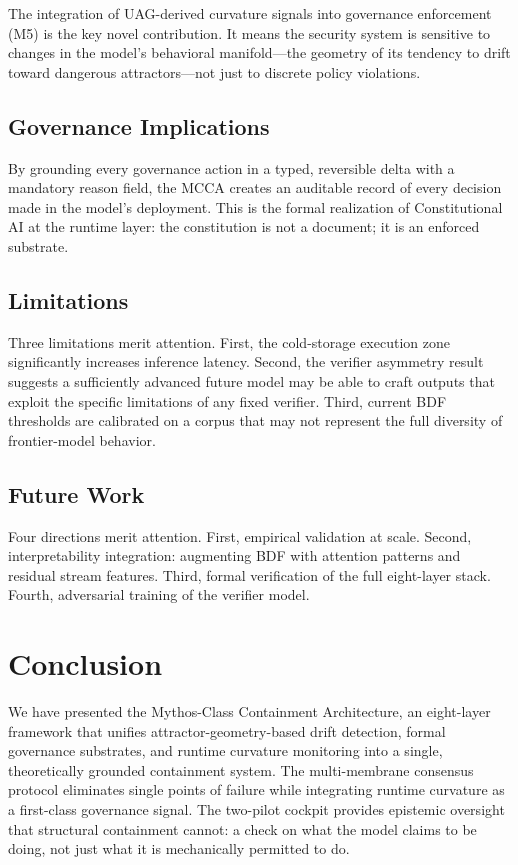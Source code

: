 \documentclass[11pt]{article}
\begin{document}
The integration of UAG-derived curvature signals into governance enforcement
(M5) is the key novel contribution.
It means the security system is sensitive to changes in the model's
behavioral manifold---the geometry of its tendency to drift toward dangerous
attractors---not just to discrete policy violations.

\subsection{Governance Implications}

By grounding every governance action in a typed, reversible delta with a
mandatory reason field, the MCCA creates an auditable record of every
decision made in the model's deployment.
This is the formal realization of Constitutional AI at the runtime layer:
the constitution is not a document; it is an enforced substrate.

\subsection{Limitations}

Three limitations merit attention.
First, the cold-storage execution zone significantly increases inference
latency.
Second, the verifier asymmetry result suggests a sufficiently advanced
future model may be able to craft outputs that exploit the specific
limitations of any fixed verifier.
Third, current BDF thresholds are calibrated on a corpus that may not
represent the full diversity of frontier-model behavior.

\subsection{Future Work}

Four directions merit attention.
First, empirical validation at scale.
Second, interpretability integration: augmenting BDF with attention patterns
and residual stream features.
Third, formal verification of the full eight-layer stack.
Fourth, adversarial training of the verifier model.

\section{Conclusion}

We have presented the Mythos-Class Containment Architecture, an eight-layer
framework that unifies attractor-geometry-based drift detection, formal
governance substrates, and runtime curvature monitoring into a single,
theoretically grounded containment system.
The multi-membrane consensus protocol eliminates single points of failure
while integrating runtime curvature as a first-class governance signal.
The two-pilot cockpit provides epistemic oversight that structural
containment cannot: a check on what the model claims to be doing, not just
what it is mechanically permitted to do.
\end{document}
